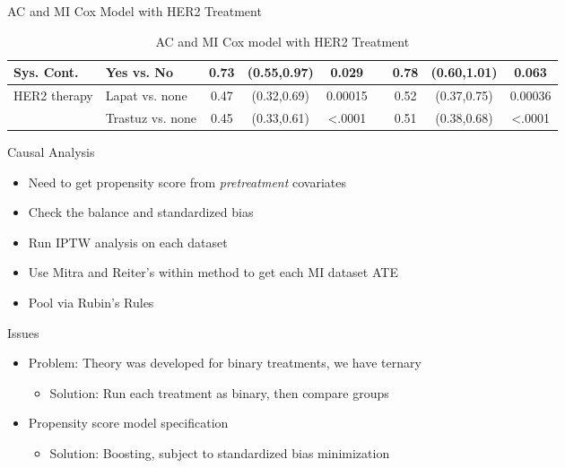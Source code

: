 \begin{frame}{AC and MI Cox Model with HER2 Treatment}
\begin{table}[]
{\begin{tabular}{|l|l|c|c|c|c|c|c|c|}
Sys. Cont.                     & Yes vs. No                       & 0.73                  & (0.55,0.97)                                        & 0.029                 &                       & 0.78 & (0.60,1.01)                                                          & 0.063                                                       \\ \hline
HER2 therapy                   & Lapat vs. none                   & 0.47                  & (0.32,0.69)                                        & 0.00015               &                       & 0.52 & (0.37,0.75)                                                          & 0.00036                                                     \\ \hline
                               & Trastuz vs. none                 & 0.45                  & (0.33,0.61)                                        & \textless.0001        &                       & 0.51 & (0.38,0.68)                                                          & \textless.0001                                              \\ \hline
\end{tabular}
}
\caption{AC and MI Cox model with HER2 Treatment}

\end{table}
\end{frame}

\begin{frame}{Causal Analysis}
\begin{itemize}
 \item Need to get propensity score from \textit{pretreatment} covariates
 \item Check the balance and standardized bias
 \item Run IPTW analysis on each dataset
 \item Use Mitra and Reiter's within method to get each MI dataset ATE \cite{Mitra2012}
 \item Pool via Rubin's Rules
\end{itemize}
\end{frame}

\begin{frame}{Issues}
\begin{itemize}
 \item Problem: Theory was developed for binary treatments, we have ternary
 \begin{itemize}
  \item Solution: Run each treatment as binary, then compare groups
 \end{itemize}
\item Propensity score model specification
\begin{itemize}
 \item Solution: Boosting, subject to standardized bias minimization
\end{itemize}
\end{itemize}
 
\end{frame}

